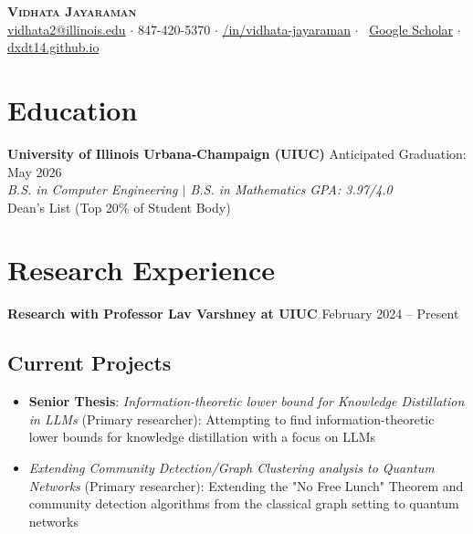 \documentclass[letterpaper,10pt]{article}
\begin{document}
\begin{center}
    \textbf{\Huge \scshape Vidhata Jayaraman} \\ \vspace{5pt}
    \small
     \href{mailto:vidhata2@illinois.edu}{vidhata2@illinois.edu} $ \cdot $
     847-420-5370 $ \cdot $
     \href{https://www.linkedin.com/in/vidhata-jayaraman/}{/in/vidhata-jayaraman} $ \cdot $
    \faGraduationCap \ \href{https://scholar.google.com/citations?user=f16twSMAAAAJ&hl=en}{Google Scholar} $ \cdot $
     \href{https://dxdt14.github.io/}{dxdt14.github.io}
\end{center}

\vspace{-3pt}


\section{Education}
\textbf{University of Illinois Urbana-Champaign (UIUC)} \hfill Anticipated Graduation: May 2026\\
\textit{B.S. in Computer Engineering $|$ B.S. in Mathematics} \hfill \textit{GPA: 3.97/4.0} \\
\small Dean's List (Top 20\% of Student Body)

\section{Research Experience}

\textbf{Research with Professor Lav Varshney at UIUC} \hfill February 2024 -- Present\vspace{-8pt}
\subsection{Current Projects}
\begin{itemize}[itemsep=-5pt, parsep=5pt, leftmargin=0.25in]
    \item \textbf{Senior Thesis}: \textit{Information-theoretic lower bound for Knowledge Distillation in LLMs} (Primary researcher): Attempting to find information-theoretic lower bounds for knowledge distillation with a focus on LLMs
    \item \textit{Extending Community Detection/Graph Clustering analysis to Quantum Networks} (Primary researcher): Extending the "No Free Lunch" Theorem and community detection algorithms from the classical graph setting to quantum networks
\end{itemize}\vspace{-10pt}
\end{document}

